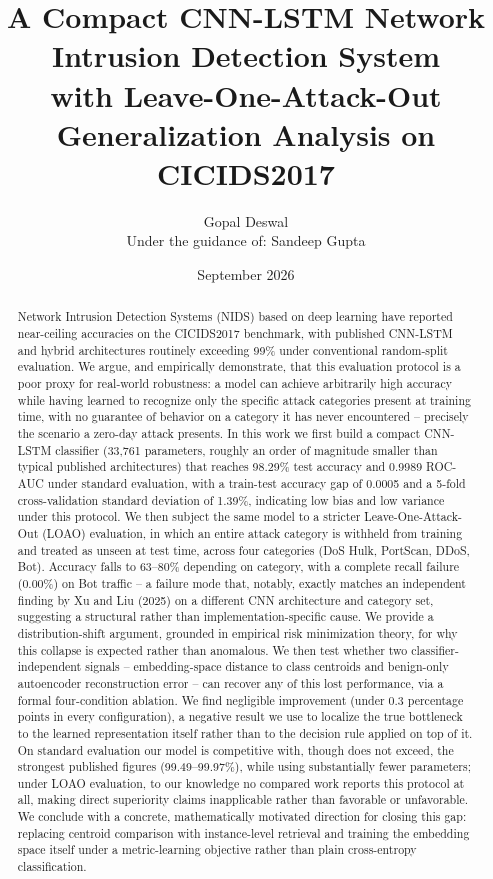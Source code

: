 \documentclass[11pt]{article}
\title{\textbf{A Compact CNN-LSTM Network Intrusion Detection System \\
with Leave-One-Attack-Out Generalization Analysis on CICIDS2017}}
\author{Gopal Deswal \\ \small Under the guidance of: Sandeep Gupta}
\date{September 2026}
\begin{document}
\maketitle

\begin{abstract}
Network Intrusion Detection Systems (NIDS) based on deep learning have reported near-ceiling
accuracies on the CICIDS2017 benchmark, with published CNN-LSTM and hybrid architectures
routinely exceeding 99\% under conventional random-split evaluation. We argue, and empirically
demonstrate, that this evaluation protocol is a poor proxy for real-world robustness: a model can
achieve arbitrarily high accuracy while having learned to recognize only the specific attack
categories present at training time, with no guarantee of behavior on a category it has never
encountered -- precisely the scenario a zero-day attack presents. In this work we first build a
compact CNN-LSTM classifier (33{,}761 parameters, roughly an order of magnitude smaller than
typical published architectures) that reaches 98.29\% test accuracy and 0.9989 ROC-AUC under
standard evaluation, with a train-test accuracy gap of 0.0005 and a 5-fold cross-validation
standard deviation of 1.39\%, indicating low bias and low variance under this protocol. We then
subject the same model to a stricter Leave-One-Attack-Out (LOAO) evaluation, in which an entire
attack category is withheld from training and treated as unseen at test time, across four
categories (DoS Hulk, PortScan, DDoS, Bot). Accuracy falls to 63--80\% depending on category, with
a complete recall failure (0.00\%) on Bot traffic -- a failure mode that, notably, exactly matches
an independent finding by Xu and Liu (2025) on a different CNN architecture and category set,
suggesting a structural rather than implementation-specific cause. We provide a distribution-shift
argument, grounded in empirical risk minimization theory, for why this collapse is expected rather
than anomalous. We then test whether two classifier-independent signals -- embedding-space distance
to class centroids and benign-only autoencoder reconstruction error -- can recover any of this lost
performance, via a formal four-condition ablation. We find negligible improvement (under 0.3
percentage points in every configuration), a negative result we use to localize the true bottleneck
to the learned representation itself rather than to the decision rule applied on top of it. On
standard evaluation our model is competitive with, though does not exceed, the strongest published
figures (99.49--99.97\%), while using substantially fewer parameters; under LOAO evaluation, to our
knowledge no compared work reports this protocol at all, making direct superiority claims
inapplicable rather than favorable or unfavorable. We conclude with a concrete, mathematically
motivated direction for closing this gap: replacing centroid comparison with instance-level
retrieval and training the embedding space itself under a metric-learning objective rather than
plain cross-entropy classification.
\end{abstract}
\end{document}
